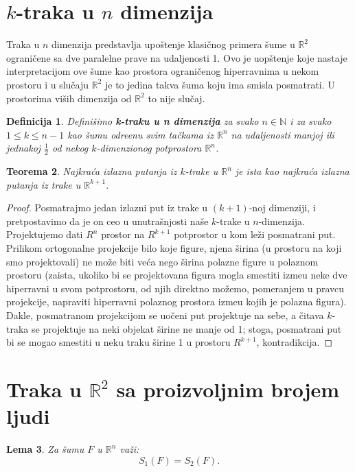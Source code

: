 \documentclass[11pt]{article}
\newtheorem{teo}{\bf Teorema}[section]
\newtheorem{lem}[teo]{\bf Lema}
\newtheorem{df}[teo]{\bf Definicija}
\begin{document}
\section[$k$-traka u $n$ dimenzija]{$k$-traka u $n$ dimenzija}
\bigskip
\indent Traka u $n$ dimenzija predstavlja upo\v stenje klasi\v cnog primera \v sume u $\mathbb{R}^2$ ograni\v cene sa dve paralelne prave na udaljenosti 1. Ovo je uop\v stenje koje nastaje interpretacijom ove \v sume kao prostora ograni\v cenog hiperravnima u nekom prostoru i u slu\v caju $\mathbb{R}^2$ je to jedina takva \v suma koju ima smisla posmatrati. U prostorima vi\v sih dimenzija od $\mathbb{R}^2$ to nije slu\v caj.
\\
\begin{df} Defini\v simo \textbf{k-traku u n dimenzija} za svako $n\in \mathbb{N}$ i za svako $1\leqslant k\leqslant n-1$  kao \v sumu odre\dj enu svim ta\v ckama iz $\mathbb{R}^n$ na udaljenosti manjoj ili jednakoj $\frac{1}{2}$ od nekog $k$-dimenzionog potprostora $\mathbb{R}^n$. 
\end{df}
\begin{teo} Najkra\' ca izlazna putanja iz $k$-trake u $\mathbb{R}^n$ je ista kao najkra\' ca izlazna putanja iz trake u $\mathbb{R}^{k+1}$.\end{teo}

\begin{proof}
    Posmatrajmo jedan izlazni put iz trake u $(k+1)$-noj
    dimenziji, i pretpostavimo da je on ceo u unutra\v snjosti na\v se
    $k$-trake u $n$-dimenzija.
    Projektujemo dati $R^n$ prostor na $R^{k+1}$ potprostor u kom
    le\v zi posmatrani put.
    Prilikom ortogonalne projekcije bilo koje figure,
    njena \v sirina (u prostoru na koji smo projektovali)
    ne mo\v ze biti ve\' ca nego \v sirina polazne figure u
    polaznom prostoru (zaista, ukoliko bi se projektovana
    figura mogla smestiti izme\dj u neke dve hiperravni u svom
    potprostoru, od njih direktno mo\v zemo, pomeranjem u pravcu
    projekcije, napraviti hiperravni polaznog prostora
    izme\dj u kojih je polazna figura).
    Dakle, posmatranom projekcijom se uo\v ceni put projektuje na sebe,
    a \v citava $k$-traka se projektuje na neki objekat \v sirine
    ne manje od 1; stoga, posmatrani put bi se mogao smestiti
    u neku traku \v sirine 1 u prostoru $R^{k+1}$, kontradikcija.
\end{proof}
\section[Traka u $\mathbb{R}^2$ sa proizvoljnim brojem ljudi]{Traka u $\mathbb{R}^2$ sa proizvoljnim brojem ljudi}
\bigskip
\begin{lem} Za \v sumu $F$ u $\mathbb{R}^n$ va\v zi: $$S_1(F)=S_2(F).$$\end{lem}
\end{document}
